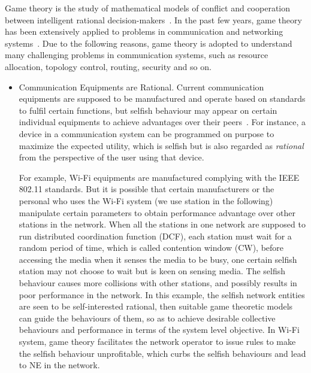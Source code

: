 Game theory is the study of mathematical models of conflict and cooperation between intelligent rational decision-makers~\cite{books_game_myerson}.
In the past few years, game theory has been extensively applied to problems in communication and networking systems~\cite{Neel06analysisand, Wang_gtc_crn_survey_2010}.
Due to the following reasons, game theory is adopted to understand many challenging problems in communication systems, such as resource allocation, topology control, routing, security and so on. 
\begin{itemize}
\item Communication Equipments are Rational.
Current communication equipments are supposed to be manufactured and operate based on standards to fulfil certain functions, but selfish behaviour may appear on certain individual equipments to achieve advantages over their peers~\cite{game_for_communication_01}.
For instance, a device in a communication system can be programmed on purpose to maximize the expected utility, which is selfish but is also regarded as \textit{rational} from the perspective of the user using that device.

For example, Wi-Fi equipments are manufactured complying with the IEEE 802.11 standards.
But it is possible that certain manufacturers or the personal who uses the Wi-Fi system (we use station in the following) manipulate certain parameters to obtain performance advantage over other stations in the network.
When all the stations in one network are supposed to run distributed coordination function (\gls{DCF}), \ie each station must wait for a random period of time, which is called contention window (\gls{CW}), before accessing the media when it senses the media to be busy, one certain selfish station may not choose to wait but is keen on sensing media.
The selfish behaviour causes more collisions with other stations, and possibly results in poor performance in the network.
In this example, the selfish network entities are seen to be self-interested rational, then suitable game theoretic models can guide the behaviours of them, so as to achieve desirable collective behaviours and performance in terms of the system level objective.
In Wi-Fi system, game theory facilitates the network operator to issue rules to make the selfish behaviour unprofitable, which curbs the selfish behaviours and lead to NE in the network.


\end{itemize}
